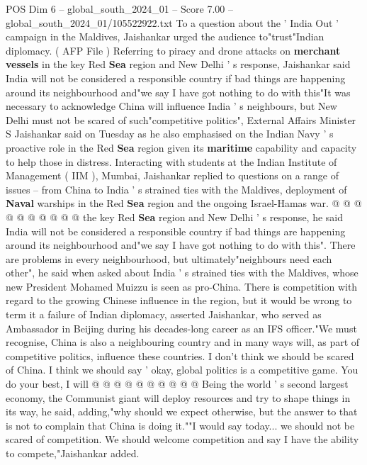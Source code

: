 \begin{textsample}{POS Dim 6 – global\_south\_2024\_01 – Score 7.00 – global\_south\_2024\_01/105522922.txt}  \label{ex:f6_pos_084}
To a question about the ' India Out ' campaign in the Maldives, Jaishankar urged the audience to"trust"Indian diplomacy. ( AFP File ) Referring to piracy and drone attacks on \textbf{merchant} \textbf{vessels} in the key Red \textbf{Sea} region and New Delhi ' s response, Jaishankar said India will not be considered a responsible country if bad things are happening around its neighbourhood and"we say I have got nothing to do with this"It was necessary to acknowledge China will influence India ' s neighbours, but New Delhi must not be scared of such"competitive politics", External Affairs Minister S Jaishankar said on Tuesday as he also emphasised on the Indian Navy ' s proactive role in the Red \textbf{Sea} region given its \textbf{maritime} capability and capacity to help those in distress.
Interacting with students at the Indian Institute of Management ( IIM ), Mumbai, Jaishankar replied to questions on a range of issues -- from China to India ' s strained ties with the Maldives, deployment of \textbf{Naval} warships in the Red \textbf{Sea} region and the ongoing Israel-Hamas war. @ @ @ @ @ @ @ @ @ @ the key Red \textbf{Sea} region and New Delhi ' s response, he said India will not be considered a responsible country if bad things are happening around its neighbourhood and"we say I have got nothing to do with this".
There are problems in every neighbourhood, but ultimately"neighbours need each other", he said when asked about India ' s strained ties with the Maldives, whose new President Mohamed Muizzu is seen as pro-China.
There is competition with regard to the growing Chinese influence in the region, but it would be wrong to term it a failure of Indian diplomacy, asserted Jaishankar, who served as Ambassador in Beijing during his decades-long career as an IFS officer."We must recognise, China is also a neighbouring country and in many ways will, as part of competitive politics, influence these countries.
I don't think we should be scared of China.
I think we should say ' okay, global politics is a competitive game.
You do your best, I will @ @ @ @ @ @ @ @ @ @ Being the world ' s second largest economy, the Communist giant will deploy resources and try to shape things in its way, he said, adding,"why should we expect otherwise, but the answer to that is not to complain that China is doing it.""I would say today... we should not be scared of competition.
We should welcome competition and say I have the ability to compete,"Jaishankar added.

\end{textsample}
